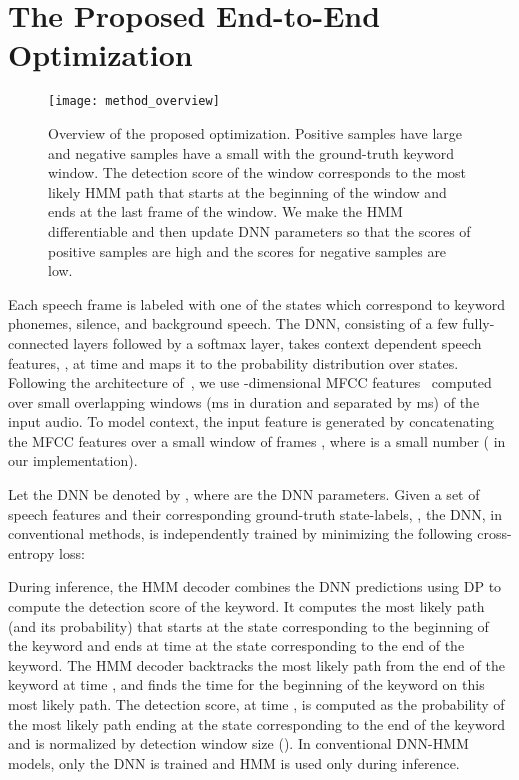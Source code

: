 \documentclass{article}
\begin{document}
\section{The Proposed End-to-End Optimization}
\begin{figure}[t]
    \centering
    \texttt{[image: method\_overview]} \\
    \vspace{-0.1in}
    \caption{Overview of the proposed optimization. Positive samples have large  and negative samples have a small  with the  ground-truth keyword window.
The detection score of the window corresponds to the most likely HMM path that starts at the beginning of the window and ends at the last frame of the window.
    We make the HMM differentiable and then update DNN parameters so that the scores of positive samples are high and the scores for negative samples are low.}
    \label{fig:method_overview}
\end{figure}

Each speech frame is labeled with one of the  states which correspond to keyword phonemes, silence, and background speech. The DNN, consisting of a few fully-connected layers followed by a softmax layer, takes context dependent speech features, , at time  and maps it to the probability distribution over  states.
Following the architecture of~\cite{SigtiaHRMB18}, we use -dimensional MFCC features~\cite{Mermelstein1976DistanceMF, Davis80comparisonof} computed over small overlapping windows (ms in duration and separated by ms) of the input audio.
To model context, the input feature  is generated by concatenating the MFCC features over a small window of frames , where  is a small number ( in our implementation).

Let the DNN be denoted by , where  are the DNN parameters.
Given a set of speech features 
and their corresponding ground-truth state-labels, , the DNN, in conventional methods, is independently trained by minimizing the following cross-entropy loss:

During inference, the HMM decoder combines the DNN predictions using DP to compute the detection score of the keyword.
It computes the most likely path (and its probability) that starts at the state corresponding to the beginning of the keyword and ends at time  at the state corresponding to the end of the keyword.
The HMM decoder backtracks the most likely path from the end of the keyword at time , and finds the time  for the beginning of the keyword on this most likely path.
The detection score, at time , is computed as the probability of the most likely path ending at the state corresponding to the end of the keyword and is normalized by detection window size ().
In conventional DNN-HMM models, only the DNN is trained and HMM is used only during inference.
\end{document}
